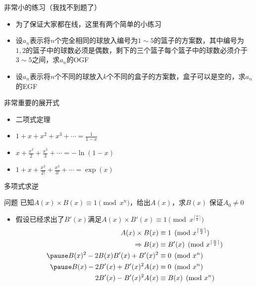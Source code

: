 \documentclass{beamer}
\begin{document}
\begin{frame}{非常小的练习（我找不到题了）}
    \begin{itemize}
        \item 为了保证大家都在线，这里有两个简单的小练习
        \item 设$a_n$表示将$n$个完全相同的球放入编号为$1\sim 5$的篮子的方案数，其中编号为$1,2$的篮子中的球数必须是偶数，剩下的三个篮子每个篮子中的球数必须介于$3\sim 5$之间，求$a_n$的OGF
        \item 设$a_n$表示将$n$个不同的球放入$k$个不同的盒子的方案数，盒子可以是空的，求$a_n$的EGF
    \end{itemize}
\end{frame}

\begin{frame}{非常重要的展开式}
    \begin{itemize}
        \item 二项式定理
        \item $1 + x + x^2 + x^3 + \cdots = \frac{1}{1 - x}$
        \item $x + \frac{x^2}{2} + \frac{x^3}{3} + \cdots = -\ln(1 - x)$
        \item $1 + x + \frac{x^2}{2!} + \frac{x^3}{3!} + \cdots = \exp(x)$
    \end{itemize}
\end{frame}

\begin{frame}{多项式求逆}
    \begin{block}{问题}
        已知$A(x)\times B(x) \equiv 1\pmod {x^n}$，给出$A(x)$，求$B(x)$\newline
        保证$A_0\neq 0$
    \end{block} \pause
    \begin{itemize}
        \item 假设已经求出了$B'(x)$满足$A(x)\times B'(x)\equiv 1\pmod {x^{\lceil\frac n2\rceil}}$\pause
        $$\begin{aligned}
            A(x)\times B(x)&\equiv 1\pmod {x^{\lceil\frac n2\rceil}}\\ 
            \Rightarrow B(x)&\equiv B'(x) \pmod {x^{\lceil\frac n2\rceil}}\\ \pause
            B(x)^2 - 2B(x)B'(x) + B'(x)^2 &\equiv 0\pmod {x^n}\\ \pause
            B(x) - 2B'(x) + B'(x)^2A(x) &\equiv 0\pmod{x^n}\\
            2B'(x) - B'(x)^2A(x) &\equiv B(x)\pmod{x^n} 
        \end{aligned}$$
    \end{itemize}
\end{frame}
\end{document}
